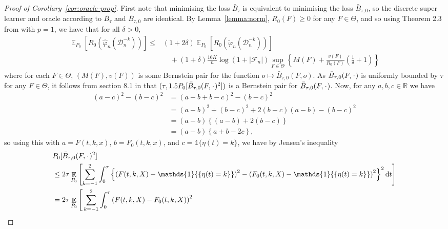 \documentclass{statsoc}
\DeclareMathOperator{\E}{\mathbb{E}} %
\newcommand{\R}{\mathbb{R}}
\newcommand{\blank}{\makebox[1ex]{\textbf{$\cdot$}}}
\renewcommand{\phi}{\varphi}
\newcommand*\diff{\mathop{}\!\mathrm{d}}
\newcommand{\1}{\mathds{1}}
\newcommand{\data}{\ensuremath{\mathcal{D}}}
\begin{document}
\begin{proof}[Proof of Corollary~\ref{cor:oracle-prop}]
  First note that minimising the loss \( \bar{B}_{\tau} \) is equivalent to
  minimising the loss \( \bar{B}_{\tau,0} \), so the discrete super learner and
  oracle according to \( \bar{B}_{\tau} \) and \( \bar{B}_{\tau,0} \) are
  identical. By Lemma~\ref{lemma:norm}, \( R_0(F) \geq 0 \) for any
  \( F \in \Theta \), and so using Theorem 2.3 from \citep{vaart2006oracle} with
  \( p=1 \), we have that for all \( \delta >0 \),
\begin{align*}
  \E_{P_0}{\left[ R_0(\hat{\phi}_n(\data_n^{-k})) \right]}
  \leq
  &(1+2\delta)\E_{P_0}{\left[ R_0(\tilde{\phi}_n(\data_n^{-k})) \right]}
  \\
  & \quad + (1+\delta) \frac{16 K}{n}
    \log(1 + |\mathcal{F}_n|)\sup_{F \in \Theta}
    \left\{
    M(F) + \frac{v(F)}{R_0(F)}
    \left(
    \frac{1}{\delta} + 1
    \right)
    \right\}
\end{align*}
where for each \( F \in \Theta \), \( (M(F), v(F)) \) is some Bernstein pair for
the function \(o \mapsto \bar{B}_{\tau,0}(F, o) \). As
\( \bar{B}_{\tau,0}(F, \blank) \) is uniformly bounded by \( \tau \) for any
\( F \in \Theta \), it follows from section 8.1 in \citep{vaart2006oracle} that
\( (\tau, 1.5 P_0{[\bar{B}_{\tau,0}(F, \blank)^2]}) \) is a Bernstein pair for
\( \bar{B}_{\tau,0}(F, \blank) \). Now, for any \( a,b,c \in \R \) we have
\begin{align*}
  (a-c)^2 - (b-c)^2
  & = (a-b+b-c)^2 - (b-c)^2
  \\
  & = (a-b)^2 + (b-c)^2 +2(b-c)(a-b) - (b-c)^2
  \\
  & = (a-b)
    \left\{
    (a-b) +  2(b-c)
    \right\}
  \\
  & = (a-b)
    \left\{
     a + b -2c
    \right\},
\end{align*}
so using this with \( a=F(t, k, x) \), \( b=F_0(t, k, x) \), and
\( c = \1{\{\eta(t) = k\}} \), we have by Jensen's inequality
\begin{align*}
  & P_0{[\bar{B}_{\tau,0}(F, \blank)^2]}
  \\
  & \leq
    2\tau\E_{P_0}{\left[
    \sum_{k=-1}^{2} \int_0^{\tau}
    \left\{
    \left(
    F(t, k, X) - \1{\{\eta(t) = k\}}
    \right)^2
    -
    \left(
    F_0(t, k, X) - \1{\{\eta(t) = k\}}
    \right)^2
    \right\}^2
    \diff t 
    \right]}
  \\
  & =2\tau
    \E_{P_0}\Bigg[
    \sum_{k=-1}^{2} \int_0^{\tau}
    \left(
    F(t, k, X) - F_0(t, k, X)
    \right)^2
  \\

\end{align*}
\end{proof}
\end{document}
